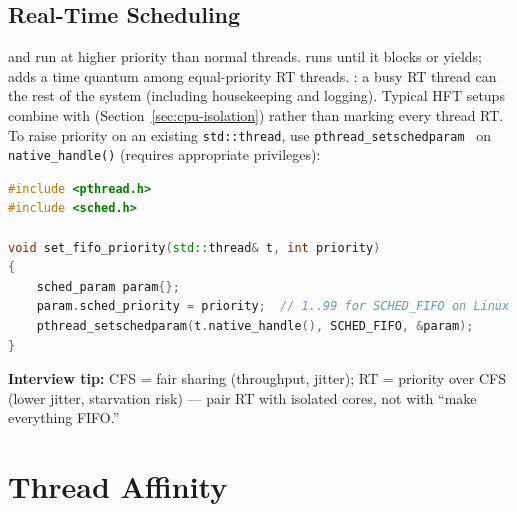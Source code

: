 \subsection{Real-Time Scheduling}
\label{subsec:realtime-scheduling}
 and  run at higher priority than normal threads. 
 runs until it blocks or yields;  adds a time quantum 
among equal-priority RT threads.
\newline
{}: a busy RT thread can  the rest of the system (including 
housekeeping and logging). Typical HFT setups combine  with 
 (Section~\ref{sec:cpu-isolation}) rather than marking every thread RT.
\newline
To raise priority on an existing \texttt{std::thread}, use \texttt{pthread\_setschedparam}~\cite{man-pthread-setschedparam} on 
\texttt{native\_handle()} (requires appropriate privileges):
\begin{lstlisting}[language=C++]
#include <pthread.h>
#include <sched.h>

void set_fifo_priority(std::thread& t, int priority)
{
    sched_param param{};
    param.sched_priority = priority;  // 1..99 for SCHED_FIFO on Linux
    pthread_setschedparam(t.native_handle(), SCHED_FIFO, &param);
}
\end{lstlisting}
\par\noindent\textbf{Interview tip:} CFS = fair sharing (throughput, jitter); RT = priority over CFS 
(lower jitter, starvation risk) --- pair RT with isolated cores, not with ``make everything FIFO.''

\section{Thread Affinity}
\label{sec:thread-affinity}

